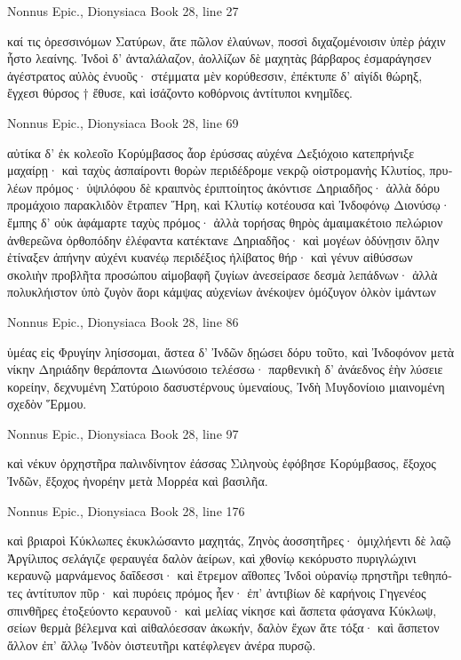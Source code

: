 \documentclass[12pt,letterpaper,twoside,final]{memoir}
\begin{document}
\begin{greek}
Nonnus Epic., Dionysiaca 
Book 28, line 27

καί τις ὀρεσσινόμων Σατύρων, ἅτε πῶλον ἐλαύνων, 
ποσσὶ διχαζομένοισιν ὑπὲρ ῥάχιν ἧστο λεαίνης. 
 Ἰνδοὶ δ' ἀνταλάλαζον, ἀολλίζων δὲ μαχητὰς 
βάρβαρος ἐσμαράγησεν ἀγέστρατος αὐλὸς ἐνυοῦς· 
στέμματα μὲν κορύθεσσιν, ἐπέκτυπε δ' αἰγίδι θώρηξ, 
ἔγχεσι θύρσος † ἔθυσε, καὶ ἰσάζοντο κοθόρνοις 
ἀντίτυποι κνημῖδες. 



Nonnus Epic., Dionysiaca 
Book 28, line 69

αὐτίκα δ' ἐκ κολεοῖο Κορύμβασος ἆορ ἐρύσσας 
αὐχένα Δεξιόχοιο κατεπρήνιξε μαχαίρῃ· 
καὶ ταχὺς ἀσπαίροντι θορὼν περιδέδρομε νεκρῷ 
οἰστρομανὴς Κλυτίος, πρυλέων πρόμος· ὑψιλόφου δὲ 
κραιπνὸς ἐριπτοίητος ἀκόντισε Δηριαδῆος· 
ἀλλὰ δόρυ προμάχοιο παρακλιδὸν ἔτραπεν Ἥρη, 
καὶ Κλυτίῳ κοτέουσα καὶ Ἰνδοφόνῳ Διονύσῳ· 
ἔμπης δ' οὐκ ἀφάμαρτε ταχὺς πρόμος· ἀλλὰ τορήσας 
θηρὸς ἀμαιμακέτοιο πελώριον ἀνθερεῶνα 
ὀρθοπόδην ἐλέφαντα κατέκτανε Δηριαδῆος· 
καὶ μογέων ὀδύνῃσιν ὅλην ἐτίναξεν ἀπήνην 
αὐχένι κυανέῳ περιδέξιος ἠλίβατος θήρ· 
καὶ γένυν αἰθύσσων σκολιὴν προβλῆτα προσώπου 
αἱμοβαφῆ ζυγίων ἀνεσείρασε δεσμὰ λεπάδνων· 
ἀλλὰ πολυκλήιστον ὑπὸ ζυγὸν ἄορι κάμψας 
αὐχενίων ἀνέκοψεν ὁμόζυγον ὁλκὸν ἱμάντων 




Nonnus Epic., Dionysiaca 
Book 28, line 86

ὑμέας εἰς Φρυγίην ληίσσομαι, ἄστεα δ' Ἰνδῶν 
δῃώσει δόρυ τοῦτο, καὶ Ἰνδοφόνον μετὰ νίκην 
Δηριάδην θεράποντα Διωνύσοιο τελέσσω· 
παρθενικὴ δ' ἀνάεδνος ἑὴν λύσειε κορείην, 
δεχνυμένη Σατύροιο δασυστέρνους ὑμεναίους, 
Ἰνδὴ Μυγδονίοιο μιαινομένη σχεδὸν Ἕρμου. 



Nonnus Epic., Dionysiaca 
Book 28, line 97

καὶ νέκυν ὀρχηστῆρα παλινδίνητον ἐάσσας 
Σιληνοὺς ἐφόβησε Κορύμβασος, ἔξοχος Ἰνδῶν, 
ἔξοχος ἠνορέην μετὰ Μορρέα καὶ βασιλῆα. 



Nonnus Epic., Dionysiaca 
Book 28, line 176

καὶ βριαροὶ Κύκλωπες ἐκυκλώσαντο μαχητάς, 
Ζηνὸς ἀοσσητῆρες· ὀμιχλήεντι δὲ λαῷ 
Ἀργίλιπος σελάγιζε φεραυγέα δαλὸν ἀείρων, 
καὶ χθονίῳ κεκόρυστο πυριγλώχινι κεραυνῷ 
μαρνάμενος δαΐδεσσι· καὶ ἔτρεμον αἴθοπες Ἰνδοὶ 
οὐρανίῳ πρηστῆρι τεθηπότες ἀντίτυπον πῦρ· 
καὶ πυρόεις πρόμος ἦεν· ἐπ' ἀντιβίων δὲ καρήνοις 
Γηγενέος σπινθῆρες ἐτοξεύοντο κεραυνοῦ· 
καὶ μελίας νίκησε καὶ ἄσπετα φάσγανα Κύκλωψ, 
σείων θερμὰ βέλεμνα καὶ αἰθαλόεσσαν ἀκωκήν, 
δαλὸν ἔχων ἅτε τόξα· καὶ ἄσπετον ἄλλον ἐπ' ἄλλῳ 
Ἰνδὸν ὀιστευτῆρι κατέφλεγεν ἀνέρα πυρσῷ. 




\end{greek}
\end{document}
